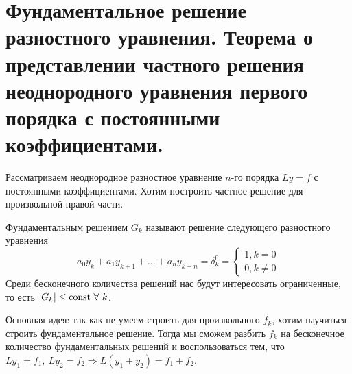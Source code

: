 \section{Фундаментальное решение разностного уравнения.
  Теорема о представлении частного решения неоднородного
  уравнения первого порядка с постоянными коэффициентами.}

Рассматриваем неоднородное разностное уравнение $n$-го порядка
$Ly=f$ с постоянными коэффициентами. Хотим
построить частное решение для произвольной правой части.

\begin{definition}
  Фундаментальным решением $G_k$ называют решение
  следующего разностного уравнения
  \[a_0y_k+a_1y_{k+1}+\ldots+a_ny_{k+n}=\delta_k^0=\begin{cases}
      1, k=0 \\
      0, k\neq0
    \end{cases}\]
  Среди бесконечного количества решений нас будут интересовать
  ограниченные, то есть $|G_k|\leq\mathrm{const}\ \forall\ k$.
\end{definition}

Основная идея: так как не умеем строить для произвольного
$f_k$, хотим научиться строить фундаментальное решение.
Тогда мы сможем разбить $f_k$ на бесконечное количество
фундаментальных решений и воспользоваться тем, что
$Ly_1=f_1,\ Ly_2=f_2\Rightarrow L(y_1+y_2)=f_1+f_2$.

